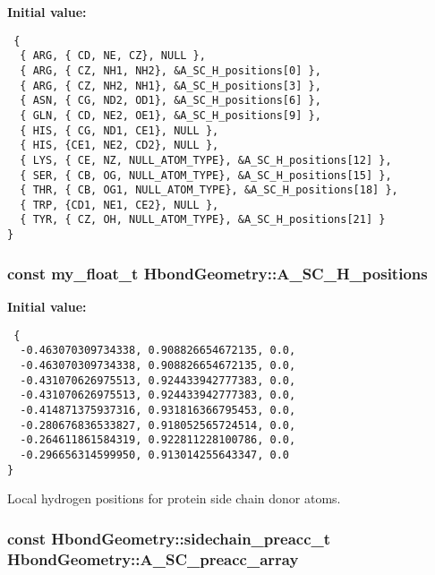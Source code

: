 \textbf{Initial value:}

\begin{Code}\begin{verbatim} {
  { ARG, { CD, NE, CZ}, NULL },
  { ARG, { CZ, NH1, NH2}, &A_SC_H_positions[0] },
  { ARG, { CZ, NH2, NH1}, &A_SC_H_positions[3] },
  { ASN, { CG, ND2, OD1}, &A_SC_H_positions[6] },
  { GLN, { CD, NE2, OE1}, &A_SC_H_positions[9] },
  { HIS, { CG, ND1, CE1}, NULL },
  { HIS, {CE1, NE2, CD2}, NULL },
  { LYS, { CE, NZ, NULL_ATOM_TYPE}, &A_SC_H_positions[12] },
  { SER, { CB, OG, NULL_ATOM_TYPE}, &A_SC_H_positions[15] },
  { THR, { CB, OG1, NULL_ATOM_TYPE}, &A_SC_H_positions[18] },
  { TRP, {CD1, NE1, CE2}, NULL },
  { TYR, { CZ, OH, NULL_ATOM_TYPE}, &A_SC_H_positions[21] }
}
\end{verbatim}\end{Code}
\subsubsection{\setlength{\rightskip}{0pt plus 5cm}const my\_\-float\_\-t \bf{Hbond\-Geometry::A\_\-SC\_\-H\_\-positions}\hspace{0.3cm}{\tt  [static, private]}}\label{classASCbase_1_1HbondGeometry_66e9722f03aaf1c9a6567284538d5fa9}


\textbf{Initial value:}

\begin{Code}\begin{verbatim} {
  -0.463070309734338, 0.908826654672135, 0.0,  
  -0.463070309734338, 0.908826654672135, 0.0,  
  -0.431070626975513, 0.924433942777383, 0.0,  
  -0.431070626975513, 0.924433942777383, 0.0,  
  -0.414871375937316, 0.931816366795453, 0.0,  
  -0.280676836533827, 0.918052565724514, 0.0,  
  -0.264611861584319, 0.922811228100786, 0.0,  
  -0.296656314599950, 0.913014255643347, 0.0   
}
\end{verbatim}\end{Code}
Local hydrogen positions for protein side chain donor atoms. 

\subsubsection{\setlength{\rightskip}{0pt plus 5cm}const \bf{Hbond\-Geometry::sidechain\_\-preacc\_\-t} Hbond\-Geometry::A\_\-SC\_\-preacc\_\-array\hspace{0.3cm}{\tt  [static, private]}}\label{classASCbase_1_1HbondGeometry_b63bedb579466023399489db46844a28}


